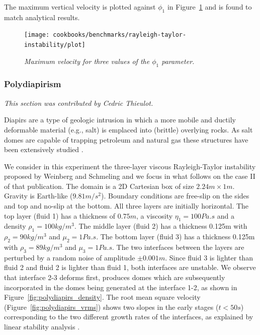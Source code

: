 \documentclass{article}
\begin{document}
The maximum vertical velocity is plotted against $\phi_1$ in Figure~\ref{fig:RTi_vels} and is found to match analytical results.     

\begin{figure}
  \centering
  \texttt{[image: cookbooks/benchmarks/rayleigh-taylor-instability/plot]}
  \caption{\it Maximum velocity for three values of the $\phi_1$ parameter.} 
  \label{fig:RTi_vels}
\end{figure}

\subsubsection{Polydiapirism}
\label{sec:benchmark-polydiapirism}

\textit{This section was contributed by Cedric Thieulot.}

Diapirs are a type of geologic intrusion in which a more mobile and ductily deformable material (e.g., salt)
is emplaced into (brittle) overlying rocks. As salt domes are capable of trapping petroleum and 
natural gas these structures have been extensively studied \cite{jahu17}.

We consider in this experiment the three-layer viscous Rayleigh-Taylor instability proposed 
by Weinberg and Schmeling \cite{wesc92} 
and we focus in what follows on the case II of that publication.
The domain is a 2D Cartesian box of size $2.24\si{m} \times 1\si{m}$. 
Gravity is Earth-like ($9.81\si{m}/\si{s}^2$).
Boundary conditions are free-slip on the sides and top and no-slip at the bottom.
All three layers are initially horizontal. The top layer (fluid 1) has a thickness of 
$0.75\si{m}$, a viscosity $\eta_1=100\si{Pa . s}$ and a density $\rho_1=100\si{kg}/\si{m}^3$. 
The middle layer (fluid 2) has a thickness 0.125m with $\rho_2=90\si{kg}/\si{m}^3$ and $\mu_2=1\si{Pa . s}$.
The bottom layer (fluid 3) has a thickness 0.125m with $\rho_3=89\si{kg}/\si{m}^3$ and $\mu_3=1\si{Pa . s}$.
The two interfaces between the layers are perturbed by a random noise of amplitude $\pm 0.001\si{m}$. 
Since fluid 3 is lighter than fluid 2 and fluid 2 is lighter than fluid 1, both interfaces are unstable.
We observe that interface 2-3 deforms first, produces domes which are subsequently incorporated in the domes 
being generated at the interface 1-2, as shown in Figure~\ref{fig:polydiapirs_density}.
The root mean square velocity (Figure~\ref{fig:polydiapirs_vrms}) shows two slopes in the early stages ($t<50\si{s}$)
corresponding to the 
two different growth rates of the interfaces, 
as explained by linear stability analysis \cite{wesc92,ramb81}.
\end{document}
